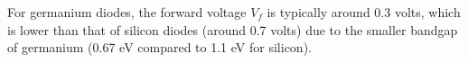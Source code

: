 For germanium diodes, the forward voltage \( V_f \) is typically around 0.3 volts, which is lower than that of silicon diodes (around 0.7 volts) due to the smaller bandgap of germanium (0.67 eV compared to 1.1 eV for silicon).

